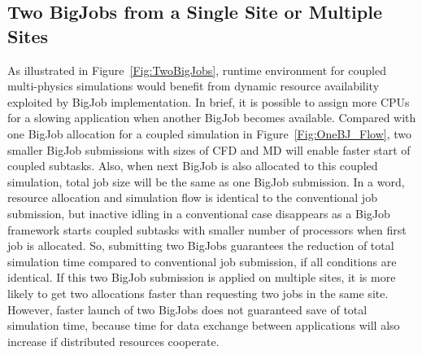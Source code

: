 \documentclass[conference,final]{IEEEtran}
\begin{document}
\subsection{Two BigJobs from a Single Site or Multiple Sites}


As illustrated in Figure~\ref{Fig:TwoBigJobs}, runtime environment for coupled multi-physics simulations would benefit from dynamic resource availability exploited by BigJob implementation. In brief, it is possible to assign more CPUs for a slowing application when another BigJob becomes available. Compared with one BigJob allocation for a coupled simulation in Figure~\ref{Fig:OneBJ_Flow}, two smaller BigJob submissions with sizes of CFD and MD will enable faster start of coupled subtasks. Also, when next BigJob is also allocated to this coupled simulation, total job size will be the same as one BigJob submission. In a word, resource allocation and simulation flow is identical to the conventional job submission, but inactive idling in a conventional case disappears as a BigJob framework starts coupled subtasks with smaller number of processors when first job is allocated. So, submitting two BigJobs guarantees the reduction of total simulation time compared to conventional job submission, if all conditions are identical. If this two BigJob submission is applied on multiple sites, it is more likely to get two allocations faster than requesting two jobs in the same site. However, faster launch of two BigJobs does not guaranteed save of total simulation time, because time for data exchange between applications will also increase if distributed resources cooperate.
\end{document}
